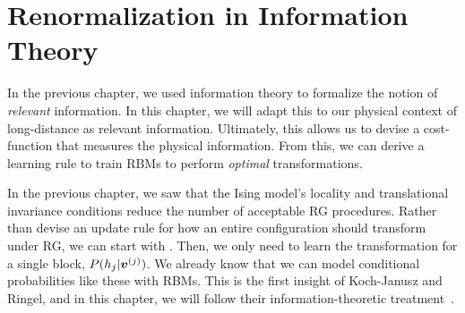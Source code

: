 \chapter{Renormalization in Information Theory}\label{sec:rsmi}
In the previous chapter, we used information theory to formalize the
notion of \textit{relevant} information. In this chapter, we will
adapt this to our physical context of long-distance as relevant
information. Ultimately, this allows us to devise a cost-function that
measures the physical information. From this, we can derive a learning
rule to train RBMs to perform \textit{optimal} transformations.

In the previous chapter, we saw that the Ising model's locality and
translational invariance conditions reduce the number of acceptable RG
procedures. Rather than devise an update rule for how an entire
configuration should transform under RG, we can start with
.  Then, we only need to learn the
transformation for a single block, $P(h_j\rvert \boldsymbol{v}^{(j)})$. We
already know that we can model conditional probabilities like these
with RBMs. This is the first insight of Koch-Janusz and Ringel, and in
this chapter, we will follow their information-theoretic
treatment~\cite{kjr}.

